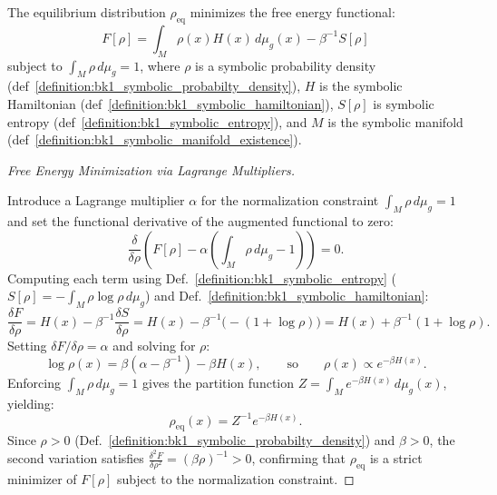 \begin{theorem}
\label{theorem:bk1_variational_principle}
The equilibrium distribution $\rho_{\text{eq}}$ minimizes the free energy functional:
\[
F[\rho] = \int_M \rho(x) H(x) \, d\mu_g(x) - \beta^{-1} S[\rho]
\]
subject to $\int_M \rho \, d\mu_g = 1$, where $\rho$ is a symbolic probability density (def~\ref{definition:bk1_symbolic_probabilty_density}), $H$ is the symbolic Hamiltonian (def~\ref{definition:bk1_symbolic_hamiltonian}), $S[\rho]$ is symbolic entropy (def~\ref{definition:bk1_symbolic_entropy}), and $M$ is the symbolic manifold (def~\ref{definition:bk1_symbolic_manifold_existence}).

\begin{proof}[Free Energy Minimization via Lagrange Multipliers]
\label{proof:bk1_lagrange_free_energy}
\leavevmode

Introduce a Lagrange multiplier $\alpha$ for the normalization constraint
$\int_M \rho\,d\mu_g = 1$ and set the functional derivative of the augmented
functional to zero:
\[
\frac{\delta}{\delta \rho}\left(F[\rho] - \alpha\!\left(\int_M \rho\,d\mu_g - 1\right)\right) = 0.
\]
Computing each term using Def.~\ref{definition:bk1_symbolic_entropy}
($S[\rho] = -\int_M \rho\log\rho\,d\mu_g$) and
Def.~\ref{definition:bk1_symbolic_hamiltonian}:
\[
\frac{\delta F}{\delta\rho}
= H(x) - \beta^{-1}\frac{\delta S}{\delta\rho}
= H(x) - \beta^{-1}\bigl(-(1+\log\rho)\bigr)
= H(x) + \beta^{-1}(1+\log\rho).
\]
Setting $\delta F/\delta\rho = \alpha$ and solving for $\rho$:
\[
\log\rho(x) = \beta(\alpha - \beta^{-1}) - \beta H(x),
\qquad\text{so}\qquad
\rho(x) \propto e^{-\beta H(x)}.
\]
Enforcing $\int_M\rho\,d\mu_g = 1$ gives the partition function $Z = \int_M e^{-\beta H(x)}\,d\mu_g(x)$, yielding:
\[
\rho_{\text{eq}}(x) = Z^{-1}e^{-\beta H(x)}.
\]
Since $\rho > 0$ (Def.~\ref{definition:bk1_symbolic_probabilty_density}) and $\beta > 0$,
the second variation satisfies $\tfrac{\delta^2 F}{\delta\rho^2} = (\beta\rho)^{-1} > 0$,
confirming that $\rho_{\text{eq}}$ is a strict minimizer of $F[\rho]$ subject to the
normalization constraint.
\end{proof}
\end{theorem}


